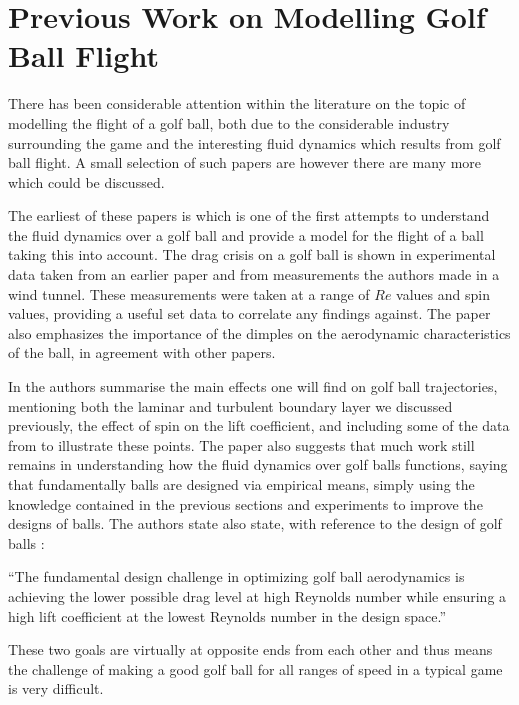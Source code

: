 \section{Previous Work on Modelling Golf Ball Flight}

There has been considerable attention within the literature on the topic of modelling the flight of a
golf ball, both due to the considerable industry surrounding the game and the interesting fluid
dynamics which results from golf ball flight. A small selection of such papers are
\citet{Smits2004,Bearman1976,Penner2003,Alam2011,Kensrud2010,Leong2007} however there are many more
which could be discussed.

The earliest of these papers is \citet{Bearman1976} which is one of the first attempts
to understand the fluid dynamics over a golf ball and provide a model for the flight of a ball taking
this into account. The drag crisis on a golf ball is shown in experimental data taken from an earlier
paper and from measurements the authors made in a wind tunnel. These measurements were taken at a range
of $Re$ values and spin values, providing a useful set data to correlate any findings against. The
paper also emphasizes the importance of the dimples on the aerodynamic characteristics of the ball,
in agreement with other papers.

In \citet{Smits2004} the authors summarise the main effects one will find on golf ball trajectories,
mentioning both the laminar and turbulent boundary layer we discussed previously, the effect of spin
on the lift coefficient, and including some of the data from \citet{Bearman1976} to illustrate these
points. The paper also suggests that much work still remains in understanding how the fluid dynamics
over golf balls functions, saying that fundamentally balls are designed via empirical means, simply
using the knowledge contained in the previous sections and experiments to improve the designs of balls.
The authors state also state, with reference to the design of golf balls \citet[page 10]{Smits2004}:

``The fundamental design challenge in optimizing golf ball aerodynamics is achieving the lower possible drag level at high Reynolds number while ensuring a high lift coefficient at the lowest Reynolds number in the design space.''

These two goals are virtually at opposite ends from each other and thus means the challenge of making
a good golf ball for all ranges of speed in a typical game is very difficult.


